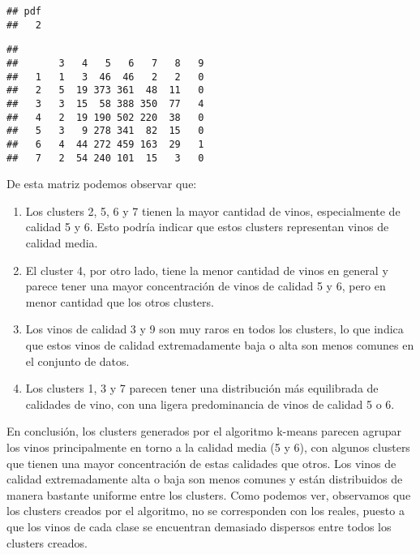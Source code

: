 \documentclass[
]{article}
\newenvironment{Shaded}{\begin{snugshade}}{\end{snugshade}}
\newcommand{\FunctionTok}[1]{\textcolor[rgb]{0.13,0.29,0.53}{\textbf{#1}}}
\newcommand{\NormalTok}[1]{#1}
\newcommand{\SpecialCharTok}[1]{\textcolor[rgb]{0.81,0.36,0.00}{\textbf{#1}}}
\begin{document}
\begin{verbatim}
## pdf 
##   2
\end{verbatim}

\begin{Shaded}
\end{Shaded}

\begin{verbatim}
##    
##       3   4   5   6   7   8   9
##   1   1   3  46  46   2   2   0
##   2   5  19 373 361  48  11   0
##   3   3  15  58 388 350  77   4
##   4   2  19 190 502 220  38   0
##   5   3   9 278 341  82  15   0
##   6   4  44 272 459 163  29   1
##   7   2  54 240 101  15   3   0
\end{verbatim}

De esta matriz podemos observar que:

\begin{enumerate}
\def\labelenumi{\arabic{enumi}.}
\item
  Los clusters 2, 5, 6 y 7 tienen la mayor cantidad de vinos,
  especialmente de calidad 5 y 6. Esto podría indicar que estos clusters
  representan vinos de calidad media.
\item
  El cluster 4, por otro lado, tiene la menor cantidad de vinos en
  general y parece tener una mayor concentración de vinos de calidad 5 y
  6, pero en menor cantidad que los otros clusters.
\item
  Los vinos de calidad 3 y 9 son muy raros en todos los clusters, lo que
  indica que estos vinos de calidad extremadamente baja o alta son menos
  comunes en el conjunto de datos.
\item
  Los clusters 1, 3 y 7 parecen tener una distribución más equilibrada
  de calidades de vino, con una ligera predominancia de vinos de calidad
  5 o 6.
\end{enumerate}

En conclusión, los clusters generados por el algoritmo k-means parecen
agrupar los vinos principalmente en torno a la calidad media (5 y 6),
con algunos clusters que tienen una mayor concentración de estas
calidades que otros. Los vinos de calidad extremadamente alta o baja son
menos comunes y están distribuidos de manera bastante uniforme entre los
clusters. Como podemos ver, observamos que los clusters creados por el
algoritmo, no se corresponden con los reales, puesto a que los vinos de
cada clase se encuentran demasiado dispersos entre todos los clusters
creados.
\end{document}
